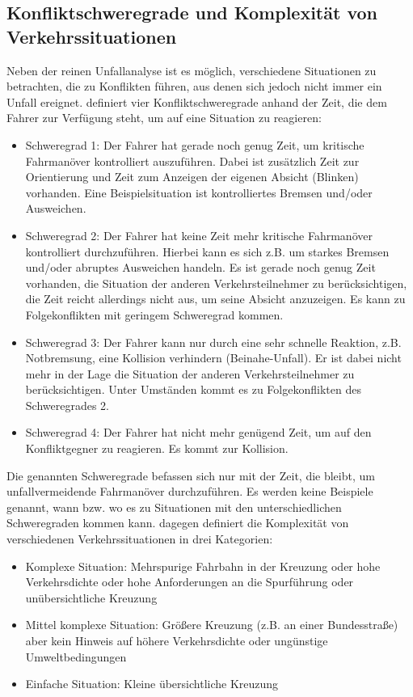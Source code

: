 \subsection{Konfliktschweregrade und Komplexität von Verkehrssituationen}
Neben der reinen Unfallanalyse ist es möglich, verschiedene Situationen zu betrachten, die zu Konflikten führen, aus denen sich jedoch nicht immer ein Unfall ereignet. \Textcite[S. 28]{Erke.1978} definiert vier Konfliktschweregrade anhand der Zeit, die dem Fahrer zur Verfügung steht, um auf eine Situation zu reagieren:

\begin{itemize}
	\item Schweregrad 1: Der Fahrer hat gerade noch genug Zeit, um kritische Fahrmanöver kontrolliert auszuführen. Dabei ist zusätzlich Zeit zur Orientierung und Zeit zum Anzeigen der eigenen Absicht (Blinken) vorhanden. Eine Beispielsituation ist kontrolliertes Bremsen und/oder Ausweichen.
	\item Schweregrad 2: Der Fahrer hat keine Zeit mehr kritische Fahrmanöver kontrolliert durchzuführen. Hierbei kann es sich z.B. um starkes Bremsen und/oder abruptes Ausweichen handeln. Es ist gerade noch genug Zeit vorhanden, die Situation der anderen Verkehrsteilnehmer zu berücksichtigen, die Zeit reicht allerdings nicht aus, um seine Absicht anzuzeigen. Es kann zu Folgekonflikten mit geringem Schweregrad kommen.
	\item Schweregrad 3: Der Fahrer kann nur durch eine sehr schnelle Reaktion, z.B. Notbremsung, eine Kollision verhindern (Beinahe-Unfall). Er ist dabei nicht mehr in der Lage die Situation der anderen Verkehrsteilnehmer zu berücksichtigen. Unter Umständen kommt es zu Folgekonflikten des Schweregrades 2.
	\item Schweregrad 4: Der Fahrer hat nicht mehr genügend Zeit, um auf den Konfliktgegner zu reagieren. Es kommt zur Kollision.
\end{itemize}

Die genannten Schweregrade befassen sich nur mit der Zeit, die bleibt, um unfallvermeidende Fahrmanöver durchzuführen. Es werden keine Beispiele genannt, wann bzw. wo es zu Situationen mit den unterschiedlichen Schweregraden kommen kann. \Textcite[S. 33f]{Meitinger.2008} dagegen definiert die Komplexität von verschiedenen Verkehrssituationen in drei Kategorien:

\begin{itemize}
	\item Komplexe Situation: Mehrspurige Fahrbahn in der Kreuzung oder hohe Verkehrsdichte oder hohe Anforderungen an die Spurführung oder unübersichtliche Kreuzung
	\item Mittel komplexe Situation: Größere Kreuzung (z.B. an einer Bundesstraße) aber kein Hinweis auf höhere Verkehrsdichte oder ungünstige Umweltbedingungen
	\item Einfache Situation: Kleine übersichtliche Kreuzung
\end{itemize}

